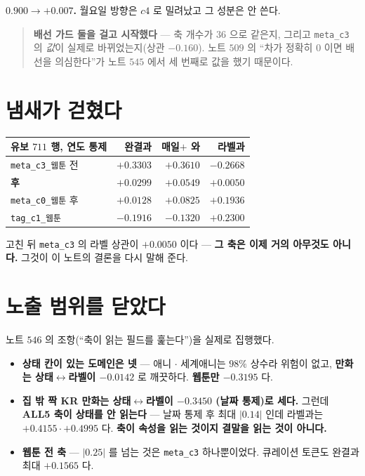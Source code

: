 \documentclass[11pt]{article}
\begin{document}
\textbf{$0.900 \to +0.007$.} 월요일 방향은 $c4$ 로 밀려났고 그 성분은
안 쓴다.

\begin{quote}
\textbf{배선 가드 둘을 걸고 시작했다} --- 축 개수가 $36$ 으로 같은지, 그리고
\texttt{meta\_c3} 의 \emph{값}이 실제로 바뀌었는지(상관 $-0.160$). 노트
$509$ 의 ``차가 정확히 $0$ 이면 배선을 의심한다''가 노트 $545$ 에서 세 번째로
값을 했기 때문이다.
\end{quote}

\section{냄새가 걷혔다}

\begin{center}
\begin{tabular}{lrrr}
\hline
유보 $711$ 행, 연도 통제 & 완결과 & 매일$+$ 와 & 라벨과 \\
\hline
\texttt{meta\_c3\_웹툰} 전 & $\mathbf{+0.3303}$ & $\mathbf{+0.3610}$ & $-0.2668$ \\
\textbf{후} & $\mathbf{+0.0299}$ & $\mathbf{+0.0549}$ & $+0.0050$ \\
\hline
\texttt{meta\_c0\_웹툰} 후 & $+0.0128$ & $+0.0825$ & $+0.1936$ \\
\texttt{tag\_c1\_웹툰} & $-0.1916$ & $-0.1320$ & $+0.2300$ \\
\hline
\end{tabular}
\end{center}

고친 뒤 \texttt{meta\_c3} 의 라벨 상관이 $+0.0050$ 이다 --- \textbf{그 축은
이제 거의 아무것도 아니다.} 그것이 이 노트의 결론을 다시 말해 준다.

\section{노출 범위를 닫았다}

노트 $546$ 의 조항(``축이 읽는 필드를 훑는다'')을 실제로 집행했다.

\begin{itemize}
\item \textbf{상태 칸이 있는 도메인은 넷} --- 애니 $\cdot$ 세계애니는
$98\%$ 상수라 위험이 없고, \textbf{만화는 상태$\leftrightarrow$라벨이
$-0.0142$} 로 깨끗하다. \textbf{웹툰만 $-0.3195$} 다.
\item \textbf{집 밖 짝 KR 만화는 상태$\leftrightarrow$라벨이 $-0.3450$
(날짜 통제)로 세다.} 그런데 \textbf{ALL5 축이 상태를 안 읽는다} --- 날짜
통제 후 최대 $|0.14|$ 인데 라벨과는 $+0.4155 \cdot +0.4995$ 다.
\textbf{축이 속성을 읽는 것이지 결말을 읽는 것이 아니다.}
\item \textbf{웹툰 전 축} --- $|0.25|$ 를 넘는 것은 \texttt{meta\_c3}
하나뿐이었다. 큐레이션 토큰도 완결과 최대 $+0.1565$ 다.
\end{itemize}
\end{document}
